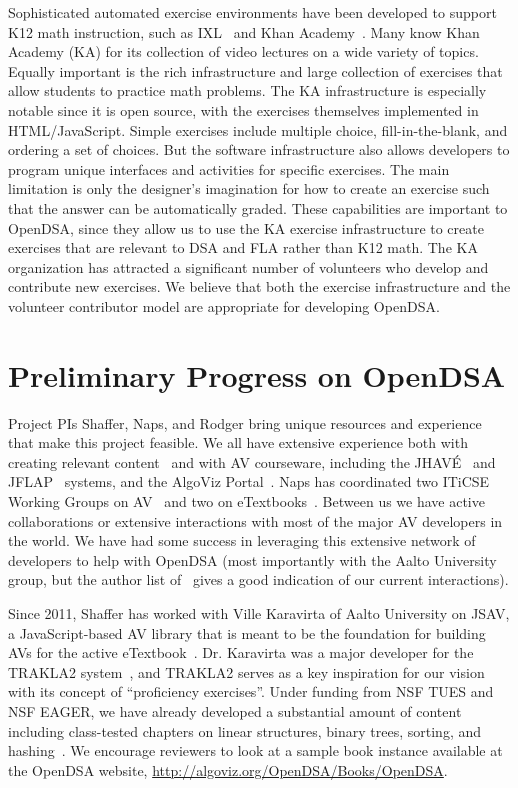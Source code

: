 \documentclass[11pt]{article}
\begin{document}
Sophisticated automated exercise environments have been
developed to support K12 math instruction,
such as IXL~\cite{IXL} and Khan Academy~\cite{KhanAcademy}.
Many know Khan Academy (KA) for its collection of video
lectures on a wide variety of topics.
Equally important is the rich infrastructure and large collection of
exercises that allow students to practice math problems.
The KA infrastructure is especially notable since it is open source,
with the exercises themselves implemented in HTML/JavaScript.
Simple exercises include multiple choice,
fill-in-the-blank, and ordering a set of choices.
But the software infrastructure also allows developers to program
unique interfaces and activities for specific exercises.
The main limitation is only the designer's imagination for how to
create an exercise such that the answer can be automatically graded.
These capabilities are important to OpenDSA, since they allow us to
use the KA exercise infrastructure to create exercises that
are relevant to DSA and FLA rather than K12 math.
The KA organization has attracted a significant
number of volunteers who develop and contribute new exercises.
We believe that both the exercise infrastructure and the volunteer
contributor model are appropriate for developing OpenDSA.

\section{Preliminary Progress on OpenDSA}
\label{Preliminary}

Project PIs Shaffer, Naps, and Rodger bring unique resources and
experience that make this project feasible.
We all have extensive experience both with creating relevant
content~\cite{ShafferText,ShafferTextThird}
and with AV courseware, including the
JHAV\'{E}~\cite{naps1992pascal,naps1992pseudocode,pothering1995cpp,Naps05}
and JFLAP~\cite{JFLAPsite,RoF06}
systems, and the AlgoViz Portal~\cite{AlgoViz}.
Naps has coordinated two ITiCSE Working Groups on
AV~\cite{NapsPanelShort,NapsShortImpact} and two
on eTextbooks~\cite{Roessling:VizCoSH,KorhonenWG13}.
Between us we have active collaborations or extensive
interactions with most of the major AV developers in the world.
We have had some success in leveraging this extensive network of
developers to help with OpenDSA (most importantly with the Aalto
University group, but the author list of~\cite{KorhonenWG13} gives a
good indication of our current interactions).

Since 2011, Shaffer has worked with Ville Karavirta of
Aalto University on JSAV, a JavaScript-based AV library
that is meant to be the foundation for building AVs for the active
eTextbook~\cite{JSAVsite,Karavirta:ITiCSE13}.
Dr. Karavirta was a major developer for the TRAKLA2
system~\cite{Malmi04,TRAKLAurl}, and TRAKLA2 serves as a key
inspiration for our vision with its concept of
``proficiency exercises''.
Under funding from NSF TUES and NSF EAGER, we have already developed a
substantial amount of content including class-tested chapters on
linear structures, binary trees, sorting, and
hashing~\cite{OpenDSAsite}.
We encourage reviewers to look at a sample book instance available at
the OpenDSA website, \url{http://algoviz.org/OpenDSA/Books/OpenDSA}.
\end{document}
